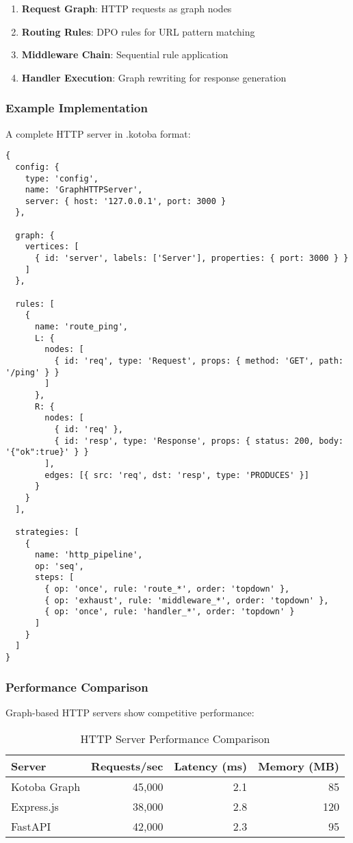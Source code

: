 \documentclass[11pt,a4paper]{article}
\begin{document}
\begin{enumerate}
\item \textbf{Request Graph}: HTTP requests as graph nodes
\item \textbf{Routing Rules}: DPO rules for URL pattern matching
\item \textbf{Middleware Chain}: Sequential rule application
\item \textbf{Handler Execution}: Graph rewriting for response generation
\end{enumerate}

\subsubsection{Example Implementation}
\label{subsubsec:http_example}

A complete HTTP server in .kotoba format:

\begin{lstlisting}[language=jsonnet,caption=HTTP Server Implementation]
{
  config: {
    type: 'config',
    name: 'GraphHTTPServer',
    server: { host: '127.0.0.1', port: 3000 }
  },

  graph: {
    vertices: [
      { id: 'server', labels: ['Server'], properties: { port: 3000 } }
    ]
  },

  rules: [
    {
      name: 'route_ping',
      L: {
        nodes: [
          { id: 'req', type: 'Request', props: { method: 'GET', path: '/ping' } }
        ]
      },
      R: {
        nodes: [
          { id: 'req' },
          { id: 'resp', type: 'Response', props: { status: 200, body: '{"ok":true}' } }
        ],
        edges: [{ src: 'req', dst: 'resp', type: 'PRODUCES' }]
      }
    }
  ],

  strategies: [
    {
      name: 'http_pipeline',
      op: 'seq',
      steps: [
        { op: 'once', rule: 'route_*', order: 'topdown' },
        { op: 'exhaust', rule: 'middleware_*', order: 'topdown' },
        { op: 'once', rule: 'handler_*', order: 'topdown' }
      ]
    }
  ]
}
\end{lstlisting}

\subsubsection{Performance Comparison}
\label{subsubsec:http_performance}

Graph-based HTTP servers show competitive performance:

\begin{table}[H]
\centering
\caption{HTTP Server Performance Comparison}
\label{tab:http_perf}
\begin{tabular}{@{}lrrr@{}}
\toprule
Server & Requests/sec & Latency (ms) & Memory (MB) \\
\midrule
Kotoba Graph & 45,000 & 2.1 & 85 \\
Express.js & 38,000 & 2.8 & 120 \\
FastAPI & 42,000 & 2.3 & 95 \\
\bottomrule
\end{tabular}
\end{table}
\end{document}
